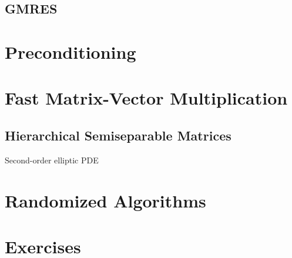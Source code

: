 \subsection{GMRES}

\section{Preconditioning}

\section{Fast Matrix-Vector Multiplication}
\subsection{Hierarchical Semiseparable Matrices}
\begin{example}
    Second-order elliptic PDE
\end{example}
\section{Randomized Algorithms}

\section{Exercises}



% 
\nocite{}


